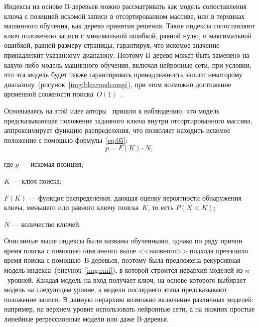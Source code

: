Индексы на основе B-деревьев можно рассматривать как модель сопоставления ключа
с позицией искомой записи в отсортированном массиве, или в терминах машинного
обучения, как дерево принятия решения. Такие индексы сопоставляют ключ положению
записи с минимальной ошибкой, равной нулю, и максимальной ошибкой, равной
размеру страницы, гарантируя, что искомое значение принадлежит указанному
диапазону. Поэтому B-дерево может быть заменено на какую-либо модель машинного
обучения, включая нейронные сети, при условии, что эта модель будет также
гарантировать принадлежность записи некоторому
диапазону~(рисунок~\ref{img:blearnedcomp}), при этом возможно достижение
временной сложности поиска~$O(1)$~\cite{main}.


Основываясь на этой идее авторы~\cite{main} пришли к наблюдению, что модель
предсказывающая положение заданного ключа внутри отсортированного массива,
аппроксимирует функцию распределения, что позволяет находить искомое положение с
помощью формулы~\eqref{eq:05}:
\begin{equation}\label{eq:05}
    p = F(K) \cdot N,
\end{equation}

где $p$ --- искомая позиция;

$K$ --- ключ поиска;

$F(K)$ --- функция распределения, дающая оценку вероятности обнаружения
ключа, меньшего или равного ключу поиска~$K$, то есть $P(X < K)$;

$N$ --- количество ключей.

Описанные выше индексы были названы обученными, однако по ряду
причин~\cite{main} время поиска с помощью описанного выше <<наивного>> подхода
превзошло время поиска с помощью~B-деревьев, поэтому была предложена рекурсивная
модель индекса~(рисунок~\ref{img:rmi}), в которой строится иерархия моделей из
$n$~уровней. Каждая модель на вход получает ключ, на основе которого выбирает
модель на следующем уровне, а модели последнего этапа предсказывают положение
записи. В данную иерархию возможно включение различных моделей: например, на
верхнем уровне использовать нейронные сети, а на нижних простые линейные
регрессионные модели или даже B-деревья. 



